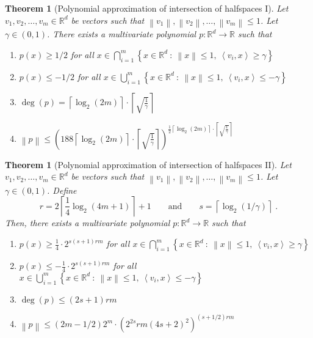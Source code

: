 \documentclass[12pt]{article}
\newtheorem{theorem}[definition]{Theorem}
\newcommand{\R}{\mathbb{R}}  %
\newcommand{\ip}[2]{\left\langle #1, #2 \right\rangle} %
\newcommand{\norm}[1]{\left\| #1 \right\|}  %
\begin{document}
\begin{theorem}[Polynomial approximation of intersection of halfspaces I]
\label{theorem:polynomial-approximation-1}
Let $v_1, v_2, \dots, v_m \in \R^d$ be vectors such that $\norm{v_1},
\norm{v_2}, \dots, \norm{v_m} \le 1$. Let $\gamma \in (0,1)$. There exists a
multivariate polynomial $p:\R^d \to \R$ such that
\begin{enumerate}
\item $p(x) \ge 1/2$ for all $\displaystyle x \in \bigcap_{i=1}^m \left\{ x \in \R^d ~:~ \norm{x} \le 1, \ \ip{v_i}{x} \ge \gamma \right\}$
\item $p(x) \le -1/2$ for all $\displaystyle x \in \bigcup_{i=1}^m \left\{ x \in \R^d ~:~ \norm{x} \le 1, \ \ip{v_i}{x} \le - \gamma \right\}$
\item $\displaystyle \deg(p) = \left\lceil \log_2(2m) \right\rceil \cdot \left\lceil \sqrt{\frac{1}{\gamma}} \right\rceil$
\item $\displaystyle \norm{p} \le \left( 188 \left\lceil \log_2(2m) \right\rceil \cdot \left\lceil \sqrt{\frac{1}{\gamma}} \right\rceil \right)^{\frac{1}{2} \left\lceil \log_2(2m) \right\rceil \cdot \left\lceil \sqrt{\frac{1}{\gamma}} \right\rceil}$
\end{enumerate}
\end{theorem}

\begin{theorem}[Polynomial approximation of intersection of halfspaces II]
\label{theorem:polynomial-approximation-2}
Let $v_1, v_2, \dots, v_m \in \R^d$ be vectors such that $\norm{v_1},
\norm{v_2}, \dots, \norm{v_m} \le 1$. Let $\gamma \in (0,1)$.
Define
$$
r = 2 \left\lceil \frac{1}{4} \log_2(4m + 1) \right\rceil + 1 \qquad \text{and} \qquad s = \left \lceil \log_2(1/\gamma) \right \rceil \; .
$$
Then, there exists a multivariate polynomial $p:\R^d \to \R$ such that
\begin{enumerate}
\item $\displaystyle p(x) \ge \frac{1}{4} \cdot 2^{s(s+1)rm}$
for all $\displaystyle x \in \bigcap_{i=1}^m \left\{ x \in \R^d ~:~ \norm{x} \le 1, \ \ip{v_i}{x} \ge \gamma \right\}$

\item $\displaystyle p(x) \le - \frac{1}{4} \cdot 2^{s(s+1)rm}$
for all $\displaystyle x \in \bigcup_{i=1}^m \left\{ x \in \R^d ~:~ \norm{x} \le 1, \ \ip{v_i}{x} \le - \gamma \right\}$

\item $\deg(p) \le (2s+1) rm$
\item $\norm{p} \le (2m-1/2) 2^m \cdot \left(2^{2s} rm (4s+2)^2 \right)^{(s+1/2)rm}$
\end{enumerate}
\end{theorem}
\end{document}
